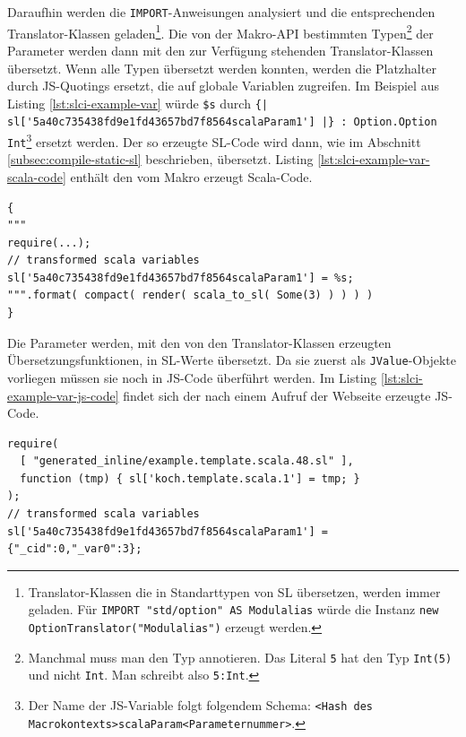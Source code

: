 \documentclass[12pt]{scrreprt}
\begin{document}
Daraufhin werden die \lstinline!IMPORT!-Anweisungen analysiert und die entsprechenden Translator-Klassen geladen\footnote{Translator-Klassen die in Standarttypen von SL übersetzen, werden immer geladen. Für \lstinline!IMPORT "std/option" AS Modulalias! würde die Instanz \lstinline!new OptionTranslator("Modulalias")! erzeugt werden.}. Die von der Makro-API bestimmten Typen\footnote{Manchmal muss man den Typ annotieren. Das Literal \lstinline!5! hat den Typ \lstinline!Int(5)! und nicht \lstinline!Int!. Man schreibt also \lstinline!5:Int!.} der Parameter werden dann mit den zur Verfügung stehenden Translator-Klassen übersetzt. 
Wenn alle Typen übersetzt werden konnten, werden die Platzhalter durch \ac{JS}-Quotings ersetzt, die auf globale Variablen zugreifen. Im Beispiel aus Listing \ref{lst:slci-example-var} würde \lstinline!$s! durch \lstinline!{| sl['5a40c735438fd9e1fd43657bd7f8564scalaParam1'] |} : Option.Option Int!\footnote{Der Name der JS-Variable folgt folgendem Schema: \lstinline!<Hash des Macrokontexts>scalaParam<Parameternummer>!.} ersetzt werden. Der so erzeugte SL-Code wird dann, wie im Abschnitt \ref{subsec:compile-static-sl} beschrieben, übersetzt. 
Listing \ref{lst:slci-example-var-scala-code} enthält den vom Makro erzeugt Scala-Code. 

\begin{lstlisting}[caption={Erzeugter Scala-Code zum Listing \ref{lst:slci-example-var}}, label=lst:slci-example-var-scala-code, float=h]
{ 
"""
require(...);
// transformed scala variables    
sl['5a40c735438fd9e1fd43657bd7f8564scalaParam1'] = %s;
""".format( compact( render( scala_to_sl( Some(3) ) ) ) )
}
\end{lstlisting}

Die Parameter werden, mit den von den Translator-Klassen erzeugten Übersetzungsfunktionen, in \ac{SL}-Werte übersetzt. Da sie zuerst als \lstinline!JValue!-Objekte vorliegen müssen sie noch in \ac{JS}-Code überführt werden. Im Listing \ref{lst:slci-example-var-js-code} findet sich der nach einem Aufruf der Webseite erzeugte \ac{JS}-Code.

\begin{lstlisting}[caption={JS-Code zum Listing \ref{lst:slci-example-var}}, label=lst:slci-example-var-js-code, float=h]
require( 
  [ "generated_inline/example.template.scala.48.sl" ],
  function (tmp) { sl['koch.template.scala.1'] = tmp; }
);
// transformed scala variables 
sl['5a40c735438fd9e1fd43657bd7f8564scalaParam1'] = {"_cid":0,"_var0":3};
\end{lstlisting}
\end{document}
